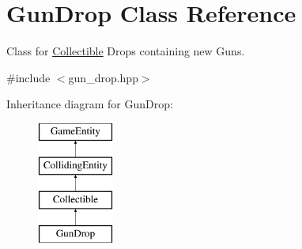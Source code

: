 \hypertarget{class_gun_drop}{}\section{Gun\+Drop Class Reference}
\label{class_gun_drop}


Class for \mbox{\hyperlink{class_collectible}{Collectible}} Drops containing new Guns.  




{\ttfamily \#include $<$gun\+\_\+drop.\+hpp$>$}

Inheritance diagram for Gun\+Drop\+:\begin{figure}[H]
\begin{center}
\leavevmode
\includegraphics[height=4.000000cm]{class_gun_drop}
\end{center}
\end{figure}
